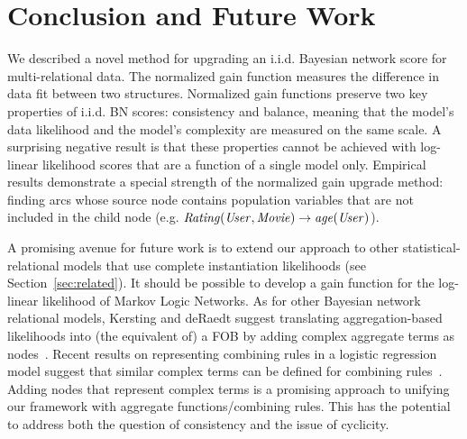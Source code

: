 \documentclass[letterpaper]{article}
\begin{document}
%



\section{Conclusion and Future Work} We described a novel method for upgrading an i.i.d. Bayesian network score for multi-relational data. The normalized gain function measures the difference in data fit between two structures. Normalized gain functions preserve two key properties of i.i.d. BN scores: consistency and balance, meaning that the model's data likelihood  and the model's complexity are measured on the same scale. A surprising negative result is that these properties cannot be achieved with log-linear likelihood scores that are a function of a single model only. Empirical results demonstrate a special strength of the normalized gain upgrade method:  finding arcs whose source node contains population variables that are not included in the child node (e.g. $\it{Rating(User,Movie)} \rightarrow \it{age(User)}$). 

A promising avenue for future work is to extend our approach to other statistical-relational models that use complete instantiation likelihoods (see Section~\ref{sec:related}). It should be possible to develop a gain function for the log-linear likelihood of Markov Logic Networks. As for other Bayesian network relational models, Kersting and deRaedt suggest translating aggregation-based likelihoods into (the equivalent of) a FOB by adding complex aggregate terms as nodes~\cite{Kersting2007}. 
Recent results on representing combining rules in a logistic regression model suggest that similar complex terms can be defined  for combining rules~\cite{Buchman2015}. 
Adding nodes that represent complex terms is a promising approach to unifying our framework with aggregate functions/combining rules. This has the potential to address both the question of consistency and the issue of cyclicity. 
\end{document}
